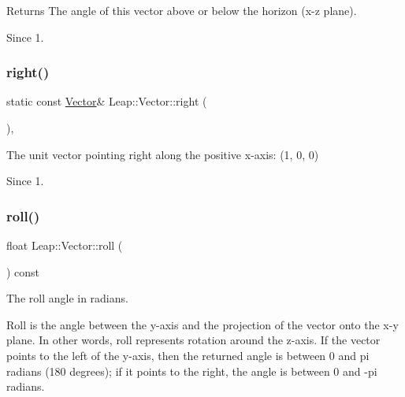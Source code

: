 \begin{DoxyReturn}{Returns}
The angle of this vector above or below the horizon (x-\/z plane). 
\end{DoxyReturn}
\begin{DoxySince}{Since}
1. 
\end{DoxySince}
\mbox{\label{struct_leap_1_1_vector_aa4d509a1640d9aa270d095c9ae8e44f2}} 
\subsubsection{\texorpdfstring{right()}{right()}}
{\footnotesize\ttfamily static const \hyperlink{struct_leap_1_1_vector}{Vector}\& Leap\+::\+Vector\+::right (\begin{DoxyParamCaption}{ }\end{DoxyParamCaption})\hspace{0.3cm}{\ttfamily [inline]}, {\ttfamily [static]}}

The unit vector pointing right along the positive x-\/axis\+: (1, 0, 0)


\begin{DoxyCodeInclude}
\end{DoxyCodeInclude}
 \begin{DoxySince}{Since}
1. 
\end{DoxySince}
\mbox{\label{struct_leap_1_1_vector_a333f0b7b114e26107ec100ea8d7c5976}} 
\subsubsection{\texorpdfstring{roll()}{roll()}}
{\footnotesize\ttfamily float Leap\+::\+Vector\+::roll (\begin{DoxyParamCaption}{ }\end{DoxyParamCaption}) const\hspace{0.3cm}{\ttfamily [inline]}}

The roll angle in radians.

Roll is the angle between the y-\/axis and the projection of the vector onto the x-\/y plane. In other words, roll represents rotation around the z-\/axis. If the vector points to the left of the y-\/axis, then the returned angle is between 0 and pi radians (180 degrees); if it points to the right, the angle is between 0 and -\/pi radians.



